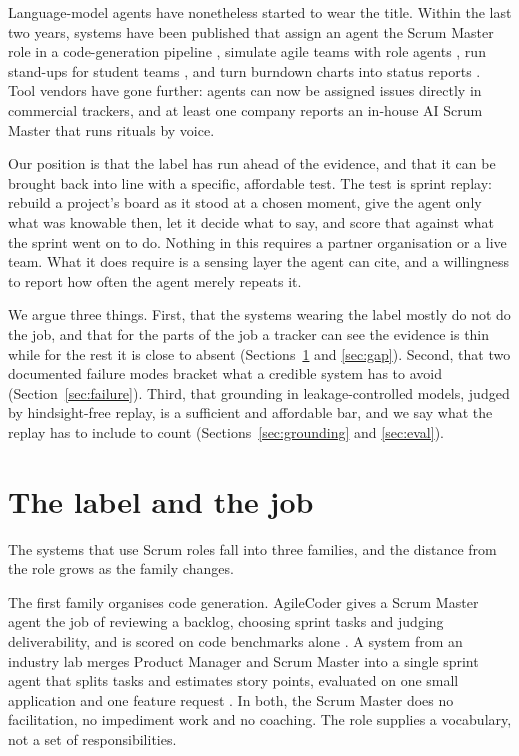 \documentclass[conference]{IEEEtran}
\begin{document}
Language-model agents have nonetheless started to wear the title. Within the last two years, systems have been published that assign an agent the Scrum Master role in a code-generation pipeline \cite{agilecoder}, simulate agile teams with role agents \cite{cognisim}, run stand-ups for student teams \cite{couder}, and turn burndown charts into status reports \cite{alliata}. Tool vendors have gone further: agents can now be assigned issues directly in commercial trackers, and at least one company reports an in-house AI Scrum Master that runs rituals by voice.

Our position is that the label has run ahead of the evidence, and that it can be brought back into line with a specific, affordable test. The test is sprint replay: rebuild a project's board as it stood at a chosen moment, give the agent only what was knowable then, let it decide what to say, and score that against what the sprint went on to do. Nothing in this requires a partner organisation or a live team. What it does require is a sensing layer the agent can cite, and a willingness to report how often the agent merely repeats it.

We argue three things. First, that the systems wearing the label mostly do not do the job, and that for the parts of the job a tracker can see the evidence is thin while for the rest it is close to absent (Sections~\ref{sec:label} and \ref{sec:gap}). Second, that two documented failure modes bracket what a credible system has to avoid (Section~\ref{sec:failure}). Third, that grounding in leakage-controlled models, judged by hindsight-free replay, is a sufficient and affordable bar, and we say what the replay has to include to count (Sections~\ref{sec:grounding} and \ref{sec:eval}).

\section{The label and the job}
\label{sec:label}

The systems that use Scrum roles fall into three families, and the distance from the role grows as the family changes.

The first family organises code generation. AgileCoder gives a Scrum Master agent the job of reviewing a backlog, choosing sprint tasks and judging deliverability, and is scored on code benchmarks alone \cite{agilecoder}. A system from an industry lab merges Product Manager and Scrum Master into a single sprint agent that splits tasks and estimates story points, evaluated on one small application and one feature request \cite{almas}. In both, the Scrum Master does no facilitation, no impediment work and no coaching. The role supplies a vocabulary, not a set of responsibilities.
\end{document}
